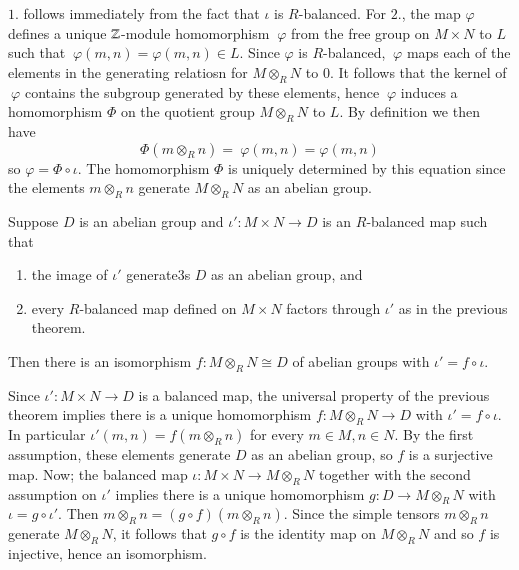 \documentclass[12pt, a4paper, twoside, openright, titlepage]{book}
\begin{document}
\begin{proof*}{}{}
    $1.$ follows immediately from the fact that $\iota$ is $R$-balanced. For $2.$, the map $\varphi$ defines a unique $\mathbb Z$-module homomorphism $~\varphi$ from the free group on $M\times N$ to $L$ such that $~\varphi(m,n) = \varphi(m,n) \in L$. Since $\varphi$ is $R$-balanced, $~\varphi$ maps each of the elements in the generating relatiosn for $M\otimes_RN$ to $0$. It follows that the kernel of $~\varphi$ contains the subgroup generated by these elements, hence $~\varphi$ induces a homomorphism $\Phi$ on the quotient group $M\otimes_RN$ to $L$. By definition we then have \begin{equation*}
        \Phi(m\otimes_Rn) = ~\varphi(m,n) = \varphi(m,n)
    \end{equation*}
    so $\varphi = \Phi\circ\iota$. The homomorphism $\Phi$ is uniquely determined by this equation since the elements $m\otimes_Rn$ generate $M\otimes_RN$ as an abelian group.
\end{proof*}

\begin{cor}{}{}
    Suppose $D$ is an abelian group and $\iota':M\times N\rightarrow D$ is an $R$-balanced map such that \begin{enumerate}
        \item the image of $\iota'$ generate3s $D$ as an abelian group, and 
        \item every $R$-balanced map defined on $M\times N$ factors through $\iota'$ as in the previous theorem.
    \end{enumerate}
    Then there is an isomorphism $f:M\otimes_RN\cong D$ of abelian groups with $\iota' = f\circ \iota$.
\end{cor}
\begin{proof*}{}{}
    Since $\iota':M\times N\rightarrow D$ is a balanced map, the universal property of the previous theorem implies there is a unique homomorphism $f:M\otimes_RN\rightarrow D$ with $\iota' = f\circ \iota$. In particular $\iota'(m,n) = f(m\otimes_Rn)$ for every $m \in M, n \in N$. By the first assumption, these elements generate $D$ as an abelian group, so $f$ is a surjective map. Now; the balanced map $\iota:M\times N\rightarrow M\otimes_R N$ together with the second assumption on $\iota'$ implies there is a unique homomorphism $g:D\rightarrow M\otimes_RN$ with $\iota = g \circ \iota'$. Then $m\otimes_Rn = (g\circ f)(m\otimes_Rn)$. Since the simple tensors $m\otimes_Rn$ generate $M\otimes_RN$, it follows that $g\circ f$ is the identity map on $M\otimes_RN$ and so $f$ is injective, hence an isomorphism.
\end{proof*}
\end{document}
